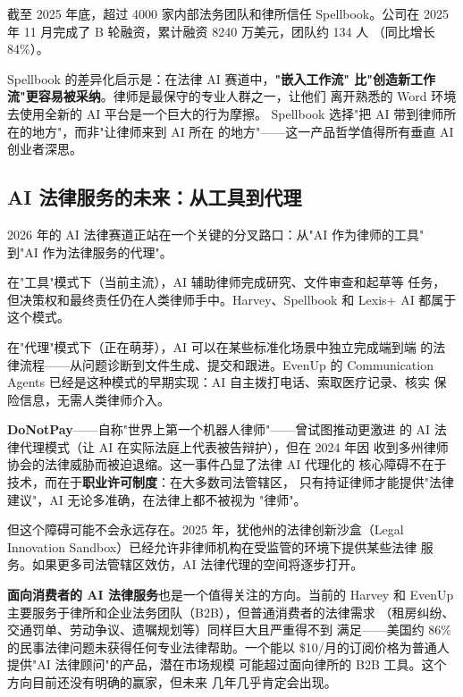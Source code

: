 截至 2025 年底，超过 4000 家内部法务团队和律所信任 Spellbook。公司在
2025 年 11 月完成了 B 轮融资，累计融资 8240 万美元，团队约 134 人
（同比增长 84\%）。

Spellbook 的差异化启示是：在法律 AI 赛道中，\textbf{"嵌入工作流"
比"创造新工作流"更容易被采纳}。律师是最保守的专业人群之一，让他们
离开熟悉的 Word 环境去使用全新的 AI 平台是一个巨大的行为摩擦。
Spellbook 选择"把 AI 带到律师所在的地方"，而非"让律师来到 AI 所在
的地方"——这一产品哲学值得所有垂直 AI 创业者深思。


\subsection{AI 法律服务的未来：从工具到代理}
\label{subsec:legal-future}

2026 年的 AI 法律赛道正站在一个关键的分叉路口：从"AI 作为律师的工具"
到"AI 作为法律服务的代理"。

在"工具"模式下（当前主流），AI 辅助律师完成研究、文件审查和起草等
任务，但决策权和最终责任仍在人类律师手中。Harvey、Spellbook 和 Lexis+
AI 都属于这个模式。

在"代理"模式下（正在萌芽），AI 可以在某些标准化场景中独立完成端到端
的法律流程——从问题诊断到文件生成、提交和跟进。EvenUp 的 Communication
Agents 已经是这种模式的早期实现：AI 自主拨打电话、索取医疗记录、核实
保险信息，无需人类律师介入。

\textbf{DoNotPay}——自称"世界上第一个机器人律师"——曾试图推动更激进
的 AI 法律代理模式（让 AI 在实际法庭上代表被告辩护），但在 2024 年因
收到多州律师协会的法律威胁而被迫退缩。这一事件凸显了法律 AI 代理化的
核心障碍不在于技术，而在于\textbf{职业许可制度}：在大多数司法管辖区，
只有持证律师才能提供"法律建议"，AI 无论多准确，在法律上都不被视为
"律师"。

但这个障碍可能不会永远存在。2025 年，犹他州的法律创新沙盒（Legal
Innovation Sandbox）已经允许非律师机构在受监管的环境下提供某些法律
服务。如果更多司法管辖区效仿，AI 法律代理的空间将逐步打开。

\textbf{面向消费者的 AI 法律服务}也是一个值得关注的方向。当前的 Harvey
和 EvenUp 主要服务于律所和企业法务团队（B2B），但普通消费者的法律需求
（租房纠纷、交通罚单、劳动争议、遗嘱规划等）同样巨大且严重得不到
满足——美国约 86\% 的民事法律问题未获得任何专业法律帮助。一个能以
\$10/月的订阅价格为普通人提供"AI 法律顾问"的产品，潜在市场规模
可能超过面向律所的 B2B 工具。这个方向目前还没有明确的赢家，但未来
几年几乎肯定会出现。



